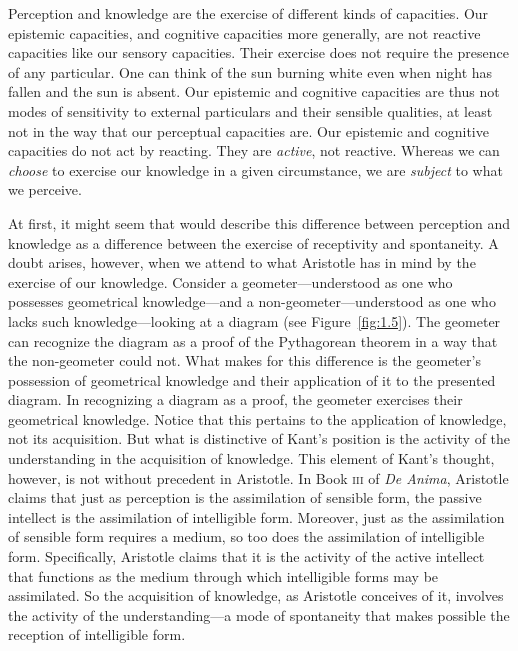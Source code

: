 Perception and knowledge are the exercise of different kinds of capacities. Our epistemic capacities, and cognitive capacities more generally, are not reactive capacities like our sensory capacities. Their exercise does not require the presence of any particular. One can think of the sun burning white even when night has fallen and the sun is absent. Our epistemic and cognitive capacities are thus not modes of sensitivity to external particulars and their sensible qualities, at least not in the way that our perceptual capacities are. Our epistemic and cognitive capacities do not act by reacting. They are \emph{active}, not reactive. Whereas we can \emph{choose} to exercise our knowledge in a given circumstance, we are \emph{subject} to what we perceive. 

At first, it might seem that \citet{Kant:1781fk} would describe this difference between perception and knowledge as a difference between the exercise of receptivity and spontaneity. A doubt arises, however, when we attend to what Aristotle has in mind by the exercise of our knowledge. Consider a geometer---understood as one who possesses geometrical knowledge---and a non-geo\-me\-ter\----understood as one who lacks such knowledge---looking at a diagram (see Figure~\ref{fig:1.5}). The geometer can recognize the diagram as a proof of the Pythagorean theorem in a way that the non-geometer could not. What makes for this difference is the geometer's possession of geometrical knowledge and their application of it to the presented diagram. In recognizing a diagram as a proof, the geometer exercises their geometrical knowledge. Notice that this pertains to the application of knowledge, not its acquisition. But what is distinctive of Kant's position is the activity of the understanding in the acquisition of knowledge. This element of Kant's thought, however, is not without precedent in Aristotle. In Book \textsc{iii} of \emph{De Anima}, Aristotle claims that just as perception is the assimilation of sensible form, the passive intellect is the assimilation of intelligible form. Moreover, just as the assimilation of sensible form requires a medium, so too does the assimilation of intelligible form. Specifically, Aristotle claims that it is the activity of the active intellect that functions as the medium through which intelligible forms may be assimilated. So the acquisition of knowledge, as Aristotle conceives of it, involves the activity of the understanding---a mode of spontaneity that makes possible the reception of intelligible form.

